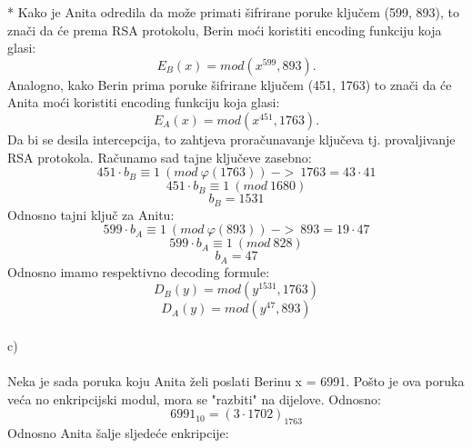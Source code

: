 \documentclass[12pt]{article}
\begin{document}
\begin{enumerate}
* Kako je Anita odredila da može primati šifrirane poruke ključem (599, 893), to znači
da će prema RSA protokolu, Berin moći koristiti encoding funkciju koja glasi:
\begin{equation*}
    E_B(x) = mod(x^{599}, 893).
\end{equation*}
Analogno, kako Berin prima poruke šifrirane ključem (451, 1763) to znači da će Anita
moći koristiti encoding funkciju koja glasi:
\begin{equation*}
    E_A(x) = mod(x^{451}, 1763).
\end{equation*}
Da bi se desila intercepcija, to zahtjeva proračunavanje ključeva tj. provaljivanje
RSA protokola. Računamo sad tajne ključeve zasebno:
\begin{equation*}
    451 \cdot b_B \equiv 1~(mod~\varphi(1763)) ~->~ 1763 = 43 \cdot 41
\end{equation*}
\begin{equation*}
    451 \cdot b_B \equiv 1~(mod~ 1680)
\end{equation*}
\begin{equation*}
    b_B = 1531
\end{equation*}
\newpage
Odnosno tajni ključ za Anitu:
\begin{equation*}
    599 \cdot b_A \equiv 1~(mod~\varphi(893)) ~->~ 893 = 19 \cdot 47
\end{equation*}
\begin{equation*}
    599 \cdot b_A \equiv 1~(mod~ 828)
\end{equation*}
\begin{equation*}
    b_A = 47
\end{equation*}
Odnosno imamo respektivno decoding formule:
\begin{equation*}
    D_B(y) = mod(y^{1531}, 1763)
\end{equation*}
\begin{equation*}
    D_A(y) = mod(y^{47}, 893)
\end{equation*}
\\
c)\\
\\
Neka je sada poruka koju Anita želi poslati Berinu x = 6991. Pošto je ova poruka
veća no enkripcijski modul, mora se "razbiti" na dijelove. Odnosno: \\
\begin{equation*}
    6991_{10} = ({3 \cdot 1702})_{1763}
\end{equation*}
Odnosno Anita šalje sljedeće enkripcije:
\begin{equation*}

\end{equation*}
\end{enumerate}
\end{document}
